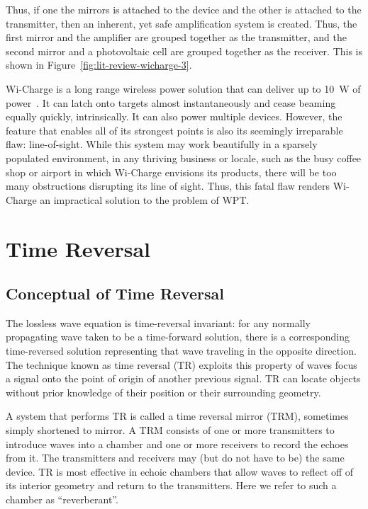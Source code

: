 Thus, if one the mirrors is attached to the device and the other is attached to the transmitter, then an inherent, yet safe amplification system is created. Thus, the first mirror and the amplifier are grouped together as the transmitter, and the second mirror and a photovoltaic cell are grouped together as the receiver. This is shown in Figure~\ref{fig:lit-review-wicharge-3}.

Wi-Charge is a long range wireless power solution that can deliver up to 10~W of power~\cite{wicharge-businesswire}. It can latch onto targets almost instantaneously and cease beaming equally quickly, intrinsically. It can also power multiple devices. However, the feature that enables all of its strongest points is also its seemingly irreparable flaw: line-of-sight. While this system may work beautifully in a sparsely populated environment, in any thriving business or locale, such as the busy coffee shop or airport in which Wi-Charge envisions its products, there will be too many obstructions disrupting its line of sight. Thus, this fatal flaw renders Wi-Charge an impractical solution to the problem of WPT.

\section{Time Reversal}
\label{lit-review-tr}

\subsection{Conceptual of Time Reversal}

The lossless wave equation is time-reversal invariant: for any normally propagating wave taken to be a time-forward solution, there is a corresponding time-reversed solution representing that wave traveling in the opposite direction. The technique known as time reversal (TR) exploits this property of waves focus a signal onto the point of origin of another previous signal. TR can locate objects without prior knowledge of their position or their surrounding geometry.

A system that performs TR is called a time reversal mirror (TRM), sometimes simply shortened to mirror. A TRM consists of one or more transmitters to introduce waves into a chamber and one or more receivers to record the echoes from it. The transmitters and receivers may (but do not have to be) the same device. TR is most effective in echoic chambers that allow waves to reflect off of its interior geometry and return to the transmitters. Here we refer to such a chamber as ``reverberant''.

